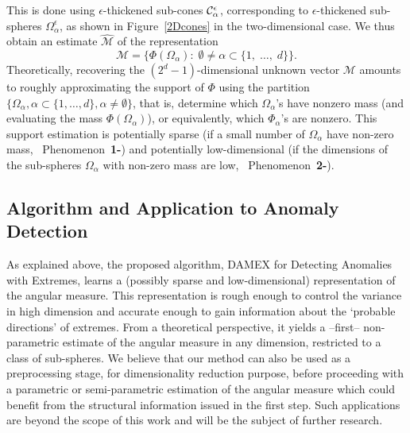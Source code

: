 This is done using $\epsilon$-thickened sub-cones $\mathcal{C}_\alpha^\epsilon$, corresponding to $\epsilon$-thickened sub-spheres $\Omega_\alpha^\epsilon$, as shown in Figure~\ref{2Dcones} in the two-dimensional case.
We thus obtain an estimate $\widehat{\mathcal{M}}$ of the representation
$$\mathcal{M} = \{ \Phi(\Omega_{\alpha}):\; \emptyset \neq \alpha\subset\{1,\; \ldots,\; d \}\}.$$
Theoretically, recovering the $(2^{d}-1)$-dimensional unknown
vector $\mathcal{M}$ amounts to roughly approximating the support of $\Phi$ using the partition
$\{\Omega_\alpha, \alpha\subset\{1,\ldots,d\}, \alpha\neq \emptyset\}$, that is, determine which $\Omega_\alpha$'s have
nonzero mass (and evaluating the mass $\Phi(\Omega_\alpha)$), or equivalently, which $\Phi_\alpha$'s are nonzero. This support estimation is potentially
sparse (if a small number of $\Omega_\alpha$ have non-zero mass, \ie~Phenomenon~\textbf{1-}) and
potentially low-dimensional (if the dimensions of the sub-spheres $\Omega_\alpha$ with non-zero mass are low, \ie~Phenomenon~\textbf{2-}).




\subsection{Algorithm and Application to Anomaly Detection}

As explained above, the proposed algorithm, DAMEX for Detecting Anomalies with Extremes, learns a (possibly sparse and low-dimensional) representation of the angular measure. This representation is rough enough to control the variance in high dimension and accurate enough to gain information about the `probable directions' of extremes. From a theoretical perspective, it yields a --first-- non-parametric estimate of the angular measure in any dimension, restricted to a class of sub-spheres. %
We believe that our method can also be used as a preprocessing stage, for dimensionality reduction purpose, before proceeding with a parametric or semi-parametric
estimation of the angular measure which could benefit from the structural information issued in the first step.  Such applications are beyond the scope of this work and will be the subject of further research. 

